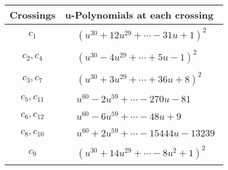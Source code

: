\documentclass[1p]{elsarticle_modified}
\theoremstyle{definition}
\begin{document}
\begin{tabular}{m{50pt}|m{274pt}}
Crossings & \hspace{64pt}u-Polynomials at each crossing \\
\hline $$\begin{aligned}c_{1}\end{aligned}$$&$\begin{aligned}
&(u^{30}+12 u^{29}+\cdots-31 u+1)^{2}
\end{aligned}$\\
\hline $$\begin{aligned}c_{2},c_{4}\end{aligned}$$&$\begin{aligned}
&(u^{30}-4 u^{29}+\cdots+5 u-1)^{2}
\end{aligned}$\\
\hline $$\begin{aligned}c_{3},c_{7}\end{aligned}$$&$\begin{aligned}
&(u^{30}+3 u^{29}+\cdots+36 u+8)^{2}
\end{aligned}$\\
\hline $$\begin{aligned}c_{5},c_{11}\end{aligned}$$&$\begin{aligned}
&u^{60}-2 u^{59}+\cdots-270 u-81
\end{aligned}$\\
\hline $$\begin{aligned}c_{6},c_{12}\end{aligned}$$&$\begin{aligned}
&u^{60}-6 u^{59}+\cdots-48 u+9
\end{aligned}$\\
\hline $$\begin{aligned}c_{8},c_{10}\end{aligned}$$&$\begin{aligned}
&u^{60}+2 u^{59}+\cdots-15444 u-13239
\end{aligned}$\\
\hline $$\begin{aligned}c_{9}\end{aligned}$$&$\begin{aligned}
&(u^{30}+14 u^{29}+\cdots-8 u^2+1)^{2}
\end{aligned}$\\
\hline
\end{tabular}\\~\\
\newpage\renewcommand{\arraystretch}{1}
\end{document}
